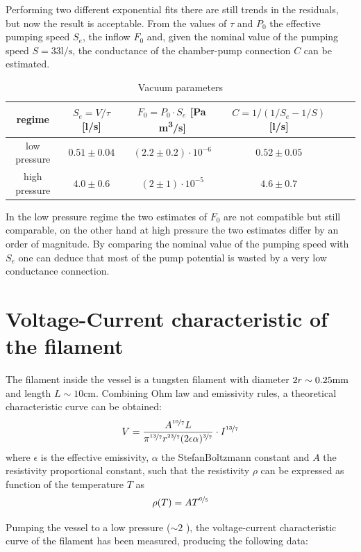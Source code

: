 \documentclass[11pt,a4 paper]{article}
\let\oldfrac\frac
\renewcommand{\frac}[3][d]{\ifthenelse{\equal{#1}{d}}{\oldfrac{#2}{#3}}{\nicefrac{#2}{#3}}}
\begin{document}
Performing two different exponential fits there are still trends in the residuals, but now the result is acceptable. From the values of $\tau$ and $P_0$ the effective pumping speed $S_e$, the inflow $F_0$ and, given the nominal value of the pumping speed $S = 33 \si{\litre/\second}$, the conductance of the chamber-pump connection $C$ can be estimated.

\begin{table}[H]
  \centering
  \begin{tabular}{cccccc}
    \toprule
    regime & $S_e = V/\tau$ [\si{\litre/\second}] & $F_0 = P_0 \cdot S_e$ [\si{\pascal}\, \si{\metre^3}/\si{\second}] & $C = 1/(1/S_e - 1/S)$ [\si{\litre/\second}] \\
    \midrule
    low pressure & $0.51 \pm 0.04$ & $(2.2 \pm 0.2)\cdot 10^{-6}$ & $0.52 \pm 0.05$ \\
    high pressure & $4.0 \pm 0.6$ & $(2 \pm 1)\cdot 10^{-5}$ & $4.6 \pm 0.7$ \\
    \bottomrule
  \end{tabular}
  \caption{Vacuum parameters}
  \label{tab:vacuum}
\end{table}

In the low pressure regime the two estimates of $F_0$ are not compatible but still comparable, on the other hand at high pressure the two estimates differ by an order of magnitude. By comparing the nominal value of the pumping speed with $S_e$ one can deduce that most of the pump potential is wasted by a very low conductance connection.

\section{Voltage-Current characteristic of the filament}
The filament inside the vessel is a tungsten filament with diameter $2r\sim0.25\si{{\milli\metre}}$ and length $L\sim10\si{\centi\metre}$. Combining Ohm law and emissivity rules, a theoretical characteristic curve can be obtained:
\[
    V = \frac{A^{\frac[f]{10}{7}}L}{\pi^{\frac[f]{13}{7}}r^{\frac[f]{23}{7}}(2\epsilon\alpha)^{\frac[f]{3}{7}}} \cdot I^{\frac[f]{13}{7}}
\]
where $\epsilon$ is the effective emissivity, $\alpha$ the StefanBoltzmann constant and $A$ the resistivity proportional constant, such that the resistivity $\rho$ can be expressed as function of the temperature $T$ as
\[
    \rho(T) = AT^{\frac[f]{6}{5}}
\]

Pumping the vessel to a low pressure ($\sim 2 $  ), the voltage-current characteristic curve of the filament has been measured, producing the following data:
\end{document}
